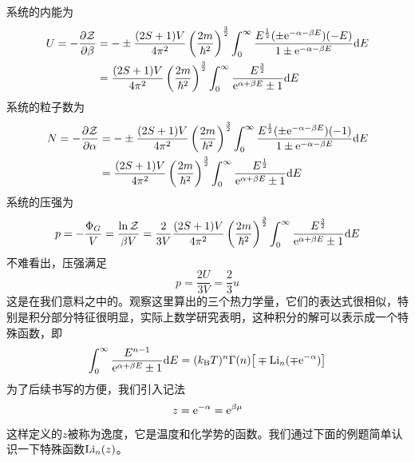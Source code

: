 \documentclass[../../main.tex]{subfiles}
\begin{document}
系统的内能为
\begin{equation}
    \begin{split}
        U=-\pdv{\mathcal{Z}}{\beta}&=-\pm\frac{(2S+1)V}{4\pi^2}\left(\frac{2m}{\hbar^2}\right)^{\frac{3}{2}}\int_0^{\infty}\frac{E^{\frac{1}{2}}(\pm\mathrm{e}^{-\alpha-\beta E})(-E)}{1\pm\mathrm{e}^{-\alpha-\beta E}}\dd E \\
        &=\frac{(2S+1)V}{4\pi^2}\left(\frac{2m}{\hbar^2}\right)^{\frac{3}{2}}\int_0^{\infty}\frac{E^{\frac{3}{2}}}{\mathrm{e}^{\alpha+\beta E}\pm1}\dd E
    \end{split}
\end{equation}
系统的粒子数为
\begin{equation}
    \begin{split}
        N=-\pdv{\mathcal{Z}}{\alpha}&=-\pm\frac{(2S+1)V}{4\pi^2}\left(\frac{2m}{\hbar^2}\right)^{\frac{3}{2}}\int_0^{\infty}\frac{E^{\frac{1}{2}}(\pm\mathrm{e}^{-\alpha-\beta E})(-1)}{1\pm\mathrm{e}^{-\alpha-\beta E}}\dd E \\
        &=\frac{(2S+1)V}{4\pi^2}\left(\frac{2m}{\hbar^2}\right)^{\frac{3}{2}}\int_0^{\infty}\frac{E^{\frac{1}{2}}}{\mathrm{e}^{\alpha+\beta E}\pm1}\dd E
    \end{split}
\end{equation}
系统的压强为
\begin{equation}
    p=-\frac{\Phi_{G}}{V}=\frac{\ln\mathcal{Z}}{\beta V}=\frac{2}{3V}\frac{(2S+1)V}{4\pi^2}\left(\frac{2m}{\hbar^2}\right)^{\frac{3}{2}}\int_0^{\infty}\frac{E^{\frac{3}{2}}}{\mathrm{e}^{\alpha+\beta E}\pm1}\dd E
\end{equation}
不难看出，压强满足
\begin{equation}
    p=\frac{2U}{3V}=\frac{2}{3}u
\end{equation}
这是在我们意料之中的。观察这里算出的三个热力学量，它们的表达式很相似，特别是积分部分特征很明显，实际上数学研究表明，这种积分的解可以表示成一个特殊函数，即
\begin{equation}\label{eq:量子理想气体特殊积分}
    \int_0^{\infty}\frac{E^{n-1}}{\mathrm{e}^{\alpha+\beta E}\pm1}\dd E=(k_{\mathrm{B}} T)^n\Gamma(n)\big[\mp \mathrm{Li}_{n}(\mp \mathrm{e}^{-\alpha})\big]
\end{equation}
为了后续书写的方便，我们引入记法
\begin{equation}
    z=\mathrm{e}^{-\alpha}=\mathrm{e}^{\beta \mu}
\end{equation}
这样定义的\(z\)被称为逸度，它是温度和化学势的函数。我们通过下面的例题简单认识一下特殊函数\(\mathrm{Li}_{n}(z)\)。
\end{document}
